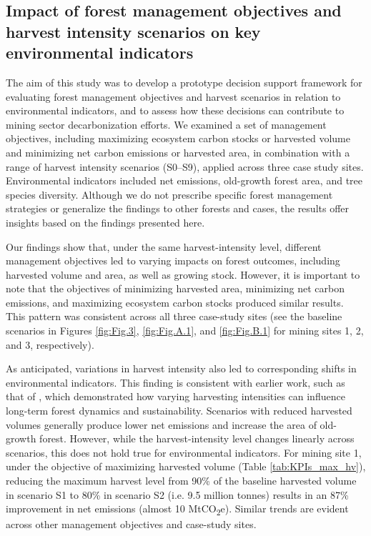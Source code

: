 \documentclass[preprint,12pt]{elsarticle}
\begin{document}
\subsection{Impact of forest management objectives and harvest  intensity scenarios on key environmental indicators}
\label{sec: Impact of forest management objectives and harvest  intensity scenarios on key environmental indicator}

The aim of this study was to develop a prototype decision support framework for evaluating forest management objectives and harvest scenarios in relation to environmental indicators, and to assess how these decisions can contribute to mining sector decarbonization efforts. We examined a set of management objectives, including maximizing ecosystem carbon stocks or harvested volume and minimizing net carbon emissions or harvested area, in combination with a range of harvest intensity scenarios (S0–S9), applied across three case study sites. Environmental indicators included net emissions, old-growth forest area, and tree species diversity. Although we do not prescribe specific forest management strategies or generalize the findings to other forests and cases, the results offer insights based on the findings presented here. 

Our findings show that, under the same harvest-intensity level, different management objectives led to varying impacts on forest outcomes, including harvested volume and area, as well as growing stock. However, it is important to note that the objectives of minimizing harvested area, minimizing net carbon emissions, and maximizing ecosystem carbon stocks produced similar results. This pattern was consistent across all three case-study sites (see the baseline scenarios in Figures \ref{fig:Fig.3}, \ref{fig:Fig.A.1}, and \ref{fig:Fig.B.1} for mining sites 1, 2, and 3, respectively). 

As anticipated, variations in harvest intensity also led to corresponding shifts in environmental indicators. This finding is consistent with earlier work, such as that of \citet{Valipour2021}, which demonstrated how varying harvesting intensities can influence long-term forest dynamics and sustainability. Scenarios with reduced harvested volumes generally produce lower net emissions and increase the area of old-growth forest. However, while the harvest-intensity level changes linearly across scenarios, this does not hold true for environmental indicators. For mining site 1, under the objective of maximizing harvested volume (Table \ref{tab:KPIs_max_hv}), reducing the maximum harvest level from 90\% of the baseline harvested volume in scenario S1 to 80\% in scenario S2 (i.e. 9.5 million tonnes) results in an 87\% improvement in net emissions (almost 10 MtCO\textsubscript{2}e). Similar trends are evident across other management objectives and case-study sites. 
\end{document}
